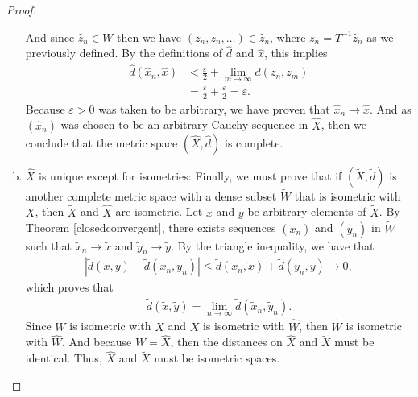 \documentclass[11pt]{article}
\theoremstyle{mystyle}
\newcommand{\0}{\mathbf{0}}
\begin{document}
\begin{proof}
\begin{enumerate}[(a)]
And since $\hat{z}_n \in W$ then we have $(z_n, z_n, \ldots) \in \hat{z}_n$, where $z_n = T^{-1}\hat{z}_n$ as we previously defined. By the definitions of $\hat{d}$ and $\hat{x}$, this implies
\begin{align*}
    \hat{d}(\hat{x}_n, \hat{x}) &< \frac{\varepsilon}{2} + \lim_{m \to \infty}d(z_n, z_m)\\
    &= \frac{\varepsilon}{2} + \frac{\varepsilon}{2} = \varepsilon.
\end{align*}
Because $\varepsilon > 0$ was taken to be arbitrary, we have proven that $\hat{x}_n \longrightarrow \hat{x}$. And as $(\hat{x}_n)$ was chosen to be an arbitrary Cauchy sequence in $\hat{X}$, then we conclude that the metric space $(\hat{X}, \hat{d})$ is complete.

\item $\hat{X}$ is unique except for isometries:\newline
Finally, we must prove that if $(\tilde{X}, \tilde{d})$ is another complete metric space with a dense subset $\tilde{W}$ that is isometric with $X$, then $\tilde{X}$ and $\hat{X}$ are isometric. Let $\tilde{x}$ and $\tilde{y}$ be arbitrary elements of $\tilde{X}$. By Theorem \ref{closedconvergent}, there exists sequences $(\tilde{x}_n)$ and $(\tilde{y}_n)$ in $\tilde{W}$ such that $\tilde{x}_n \longrightarrow \tilde{x}$ and $\tilde{y}_n \longrightarrow \tilde{y}$. By the triangle inequality, we have that 
\begin{align*}
    |\tilde{d}(\tilde{x}, \tilde{y}) - \tilde{d}(\tilde{x}_n, \tilde{y}_n)| \leq \tilde{d}(\tilde{x}_n, \tilde{x}) + \tilde{d}(\tilde{y}_n, \tilde{y}) \longrightarrow 0,
\end{align*}
which proves that
\begin{align*}
    \tilde{d}(\tilde{x}, \tilde{y}) = \lim_{n \longrightarrow \infty} \tilde{d}(\tilde{x}_n, \tilde{y}_n).
\end{align*}
Since $\tilde{W}$ is isometric with $X$ and $X$ is isometric with $\hat{W}$, then $\tilde{W}$ is isometric with $\hat{W}$. And because $\bar{W} = \hat{X}$, then the distances on $\hat{X}$ and $\tilde{X}$ must be identical. Thus, $\hat{X}$ and $\tilde{X}$ must be isometric spaces.
\end{enumerate}
\end{proof}
\end{document}
